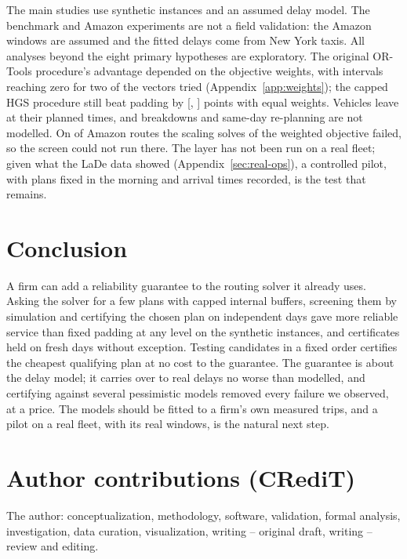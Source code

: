 \documentclass[11pt,a4paper]{article}
\theoremstyle{remark}
\begin{document}
The main studies use synthetic instances and an assumed delay model. The benchmark
and Amazon experiments are not a field validation: the Amazon windows are assumed and
the fitted delays come from New York taxis. All analyses beyond the eight primary
hypotheses are exploratory. The original OR-Tools procedure's advantage depended on the
objective weights, with intervals reaching zero for two of the vectors tried
(Appendix~\ref{app:weights}); the capped HGS procedure still beat padding by \HwEqPad{}
[\HwEqPadLo, \HwEqPadHi] points with equal weights. Vehicles leave at their planned times,
and breakdowns and same-day re-planning are not modelled. On \AmzHNotRun{} of \AmzHRoutes{}
Amazon routes the scaling solves of the weighted objective failed, so the screen could
not run there. The layer has not been run on a real fleet; given what the LaDe data
showed (Appendix~\ref{sec:real-ops}), a controlled pilot, with plans fixed in the morning
and arrival times recorded, is the test that remains.

\section{Conclusion}\label{sec:conclusion}

A firm can add a reliability guarantee to the routing solver it already uses. Asking
the solver for a few plans with capped internal buffers, screening them by
simulation and certifying the chosen plan on independent days gave more reliable
service than fixed padding at any level on the synthetic instances, and certificates
held on fresh days without exception. Testing candidates in a fixed order certifies
the cheapest qualifying plan at no cost to the guarantee. The guarantee is about the
delay model; it carries over to real delays no worse than modelled, and certifying
against several pessimistic models removed every failure we observed, at a price. The models should be fitted to a
firm's own measured trips, and a pilot on a real fleet, with its real windows, is the
natural next step.



\section*{Author contributions (CRediT)}
 The author: conceptualization, methodology, software,
validation, formal analysis, investigation, data curation, visualization, writing --
original draft, writing -- review and editing.
\end{document}
